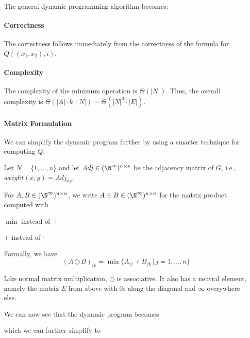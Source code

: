 The general dynamic programming algorithm becomes:

\begin{acode}
\end{acode}

\paragraph{Correctness}
The correctness follows immediately from the correctness of the formula for $Q((x_1,x_2),i)$.

\paragraph{Complexity}
The complexity of the minimum operation is $\Theta(|N|)$.
Thus, the overall complexity is $\Theta(|A|\cdot k\cdot |N|)= \Theta(|N|^3\cdot |E|)$.

\paragraph{Matrix Formulation}
We can simplify the dynamic program further by using a smarter technique for computing $Q$.

Let $N=\{1,\ldots,n\}$ and let $Adj\in(\N^\infty)^{n\times n}$ be the adjacency matrix of $G$, i.e., $weight(x,y)=Adj_{xy}$.

For $A,B\in (\N^\infty)^{n\times n}$, we write $A\odot B \in (\N^\infty)^{n\times n}$ for the matrix product computed with
\begin{compactitem}
 \item $\min$ instead of $+$
 \item $+$ instead of $\cdot$
\end{compactitem}
Formally, we have
\[(A\odot B)_{ik}=\min \{A_{ij}+B_{jk}\,|\,j=1,\ldots,n\}\]

Like normal matrix multiplication, $\odot$ is associative.
It also has a neutral element, namely the matrix $E$ from above with $0$s along the diagonal and $\infty$ everywhere else.

We can now see that the dynamic program becomes
\begin{acode}
\end{acode}
which we can further simplify to
\begin{acode}
\end{acode}

